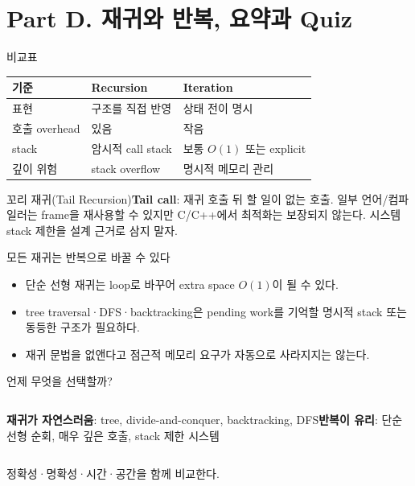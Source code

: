 \section{Part D. 재귀와 반복, 요약과 Quiz}
\begin{frame}{비교표}\small\begin{tabular}{@{}lll@{}}\toprule 기준&Recursion&Iteration\\\midrule 표현&구조를 직접 반영&상태 전이 명시\\호출 overhead&있음&작음\\stack&암시적 call stack&보통 $O(1)$ 또는 explicit\\깊이 위험&stack overflow&명시적 메모리 관리\\\bottomrule\end{tabular}
\end{frame}
\begin{frame}{꼬리 재귀(Tail Recursion)}\textbf{Tail call}: 재귀 호출 뒤 할 일이 없는 호출. 일부 언어/컴파일러는 frame을 재사용할 수 있지만 C/C++에서 최적화는 보장되지 않는다. 시스템 stack 제한을 설계 근거로 삼지 말자.
\end{frame}
\begin{frame}{모든 재귀는 반복으로 바꿀 수 있다}
\begin{itemize}
  \item 단순 선형 재귀는 loop로 바꾸어 extra space $O(1)$이 될 수 있다.
  \item tree traversal·DFS·backtracking은 pending work를 기억할 명시적 stack 또는 동등한 구조가 필요하다.
  \item 재귀 문법을 없앤다고 점근적 메모리 요구가 자동으로 사라지지는 않는다.
\end{itemize}
\end{frame}
\begin{frame}{언제 무엇을 선택할까?}\begin{columns}[T]\textbf{재귀가 자연스러움}: tree, divide-and-conquer, backtracking, DFS\textbf{반복이 유리}: 단순 선형 순회, 매우 깊은 호출, stack 제한 시스템\end{columns}\vfill 정확성·명확성·시간·공간을 함께 비교한다.
\end{frame}
